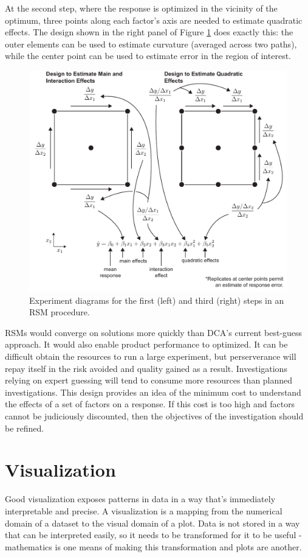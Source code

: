\documentclass[11pt,a4paper,article]{memoir} %
\begin{document}
At the second step, where the response is optimized in the vicinity of the optimum,  three points along each factor's axis are needed to estimate quadratic effects. The design shown in the right panel of Figure \ref{fig:rsm_design} does exactly this: the outer elements can be used to estimate curvature (averaged across two paths), while the center point can be used to estimate error in the region of interest.
\begin{figure}
\includegraphics[width=\textwidth]{RSM_design.pdf}
\caption{Experiment diagrams for the first (left) and third (right) steps in an RSM procedure.}
\label{fig:rsm_design}
\end{figure}

RSMs would converge on solutions more quickly than DCA's current best-guess approach. It would also enable product performance to optimized. It can be difficult obtain the resources to run a large experiment, but perserverance will repay itself in the risk avoided and quality gained as a result. Investigations relying on expert guessing will tend to consume more resources than planned investigations. This design provides an idea of the minimum cost to understand the effects of a set of factors on a response. If this cost is too high and factors cannot be judiciously discounted, then the objectives of the investigation should be refined.

\newpage
\section{Visualization}
\label{suggested_vis}
Good visualization exposes patterns in data in a way that's immediately interpretable and precise. A visualization is a mapping from the numerical domain of a dataset to the visual domain of a plot. Data is not stored in a way that can be interpreted easily, so it needs to be transformed for it to be useful - mathematics is one means of making this transformation and plots are another.
\end{document}
